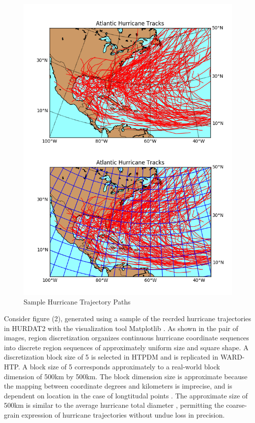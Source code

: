 \documentclass[12pt,conference]{IEEEtran}
\begin{document}
\begin{figure}[htp]
\caption{Sample Hurricane Trajectory Paths}
\centering
\includegraphics[scale=0.55]{Merged-Trajectory-Comparison}
\end{figure}

Consider figure (2), generated using a sample of the recrded hurricane trajectories in HURDAT2 with the visualization tool Matplotlib \cite{matplotlib}. As shown in the pair of images, region discretization organizes continuous hurricane coordinate sequences into discrete region sequences of approximately uniform size and square shape. A discretization block size of 5 is selected in HTPDM and is replicated in WARD-HTP. A block size of 5 corresponds approximately to a real-world block dimension of 500km by 500km. The block dimension size is approximate because the mapping between coordinate degrees and kilometers is imprecise, and is dependent on location in the case of longtitudal points \cite{lat-long-distance}. The approximate size of 500km is similar to the average hurricane total diameter \cite{hurricane-distances}, permitting the coarse-grain expression of hurricane trajectories without undue loss in precision.
\end{document}
